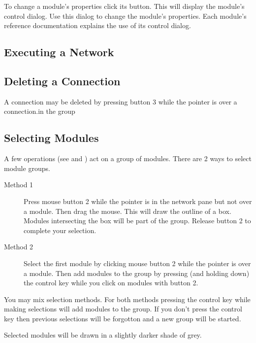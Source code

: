 To change a module's properties click its  button.  This will
display the module's control dialog.  Use this dialog to change the
module's properties.  Each module's reference documentation explains the
use of its control dialog.

\subsection{Executing a Network}
\label{sec:executenet}

\ytbd

\subsection{Deleting a Connection}
\label{sec:deleteconnections}

A connection may be deleted by pressing button 3 while the pointer is
over a connection.in the group 

\subsection{Selecting Modules}
\label{sec:selectmods}

A few operations (see  and
) act on a group of
modules.  There are 2 ways to select module groups.

\begin{description}
\item[Method 1] Press mouse button 2 while the pointer is in the network
  pane but not over a module.  Then drag the mouse.  This will draw the
  outline of a box.  Modules intersecting the box will be part of the
  group.  Release button 2 to complete your selection.
\item[Method 2] Select the first module by clicking mouse
  button 2 while the pointer is over a module.  Then add modules to the
  group by pressing (and holding down) the control key while you click on
  modules with button 2.
\end{description}

You may mix selection methods.  For both methods pressing the control key
while making selections will add modules to the group.  If you don't press
the control key then previous selections will be forgotton and a new group
will be started.

Selected modules will be drawn in a slightly darker shade of grey.

